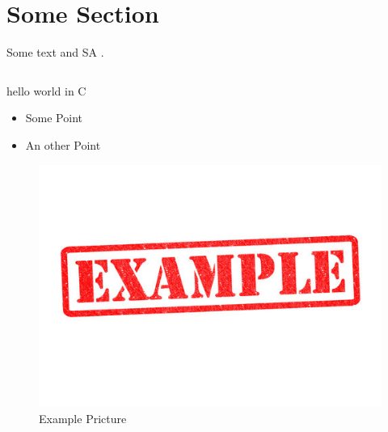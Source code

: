\section{Some Section}\label{sec:some-sec}
Some text and \ac{SA} \cite{example-source}.

\begin{listing}
  \inputminted{c}{code/code.c}
  \caption{hello world in C}
  \label{lst:hello-world}
\end{listing}

\begin{itemize}
  \item Some Point
  \item An other Point
\end{itemize}

\begin{figure}
  \includegraphics[scale=1]{graphics/example.jpg}
  \centering{}
  \caption{Example Pricture}
  \label{fig:example-fig}
\end{figure}
\restoregeometry{}